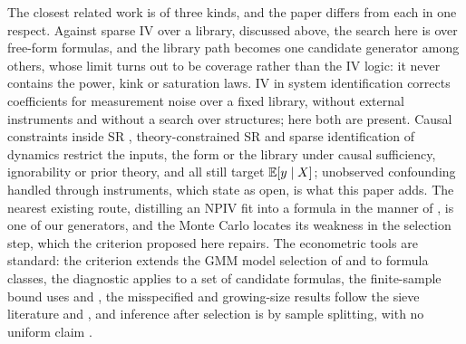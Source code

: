 The closest related work is of three kinds, and the paper differs from each in one respect. Against sparse IV over a library, discussed above, the search here is over free-form formulas, and the library path becomes one candidate generator among others, whose limit turns out to be coverage rather than the IV logic: it never contains the power, kink or saturation laws. IV in system identification \citep{kuanglin2026,zeiringer2026} corrects coefficients for measurement noise over a fixed library, without external instruments and without a search over structures; here both are present. Causal constraints inside SR \citep{yan_srit,li2026,kacprzyk2024}, theory-constrained SR \citep{kronberger2022,cornelio2023,corywright2024,russeil2024} and sparse identification of dynamics \citep{brunton2016} restrict the inputs, the form or the library under causal sufficiency, ignorability or prior theory, and all still target $\mathbb{E}[y \mid X]$; unobserved confounding handled through instruments, which \citet{yan_srit} state as open, is what this paper adds. The nearest existing route, distilling an NPIV fit into a formula in the manner of \citet{cranmer2020}, is one of our generators, and the Monte Carlo locates its weakness in the selection step, which the criterion proposed here repairs. The econometric tools are standard: the criterion extends the GMM model selection of \citet{andrews1999} and \citet{andrewslu2001} to formula classes, the diagnostic applies \citet{stockwright2000} to a set of candidate formulas, the finite-sample bound uses \citet{tropp2012} and \citet{hsukakadezhang2012}, the misspecified and growing-size results follow the sieve literature \citep{aichen2003,chen2007,chenpouzo2012} and \citet{hallinoue2003}, and inference after selection is by sample splitting, with no uniform claim \citep{leebpotscher2005,berk2013}.

